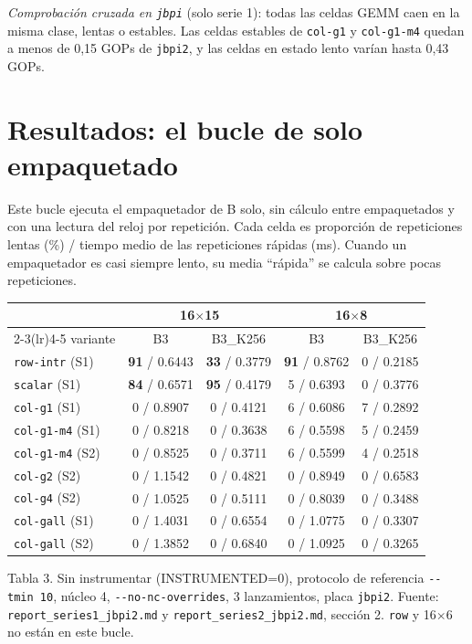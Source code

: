 \documentclass[10pt,a4paper]{article}
\newcommand{\bad}[1]{\textcolor{red!70!black}{\textbf{#1}}}
\begin{document}
\emph{Comprobación cruzada en \texttt{jbpi}} (solo serie 1): todas las celdas GEMM caen en la misma clase, lentas o estables. Las
celdas estables de \texttt{col-g1} y \texttt{col-g1-m4} quedan a menos de 0,15 GOPs de \texttt{jbpi2}, y las celdas en estado lento
varían hasta 0,43 GOPs.

\clearpage
\section{Resultados: el bucle de solo empaquetado}
\label{sec:packonly}
Este bucle ejecuta el empaquetador de B solo, sin cálculo entre empaquetados y con una lectura del reloj por repetición. Cada celda es
proporción de repeticiones lentas (\%) / tiempo medio de las repeticiones rápidas (ms). Cuando un empaquetador es casi siempre lento,
su media ``rápida'' se calcula sobre pocas repeticiones.

\begin{center}\footnotesize\setlength{\tabcolsep}{4pt}
\begin{tabular}{@{}lcccc@{}}
\toprule
 & \multicolumn{2}{c}{16$\times$15} & \multicolumn{2}{c}{16$\times$8} \\
\cmidrule(lr){2-3}\cmidrule(lr){4-5}
variante & B3 & B3\_K256 & B3 & B3\_K256 \\
\midrule
\texttt{row-intr} (S1) & \bad{91} / 0.6443 & \bad{33} / 0.3779 & \bad{91} / 0.8762 & 0 / 0.2185 \\
\texttt{scalar} (S1) & \bad{84} / 0.6571 & \bad{95} / 0.4179 & 5 / 0.6393 & 0 / 0.3776 \\
\texttt{col-g1} (S1) & 0 / 0.8907 & 0 / 0.4121 & 6 / 0.6086 & 7 / 0.2892 \\
\texttt{col-g1-m4} (S1) & 0 / 0.8218 & 0 / 0.3638 & 6 / 0.5598 & 5 / 0.2459 \\
\texttt{col-g1-m4} (S2) & 0 / 0.8525 & 0 / 0.3711 & 6 / 0.5599 & 4 / 0.2518 \\
\texttt{col-g2} (S2) & 0 / 1.1542 & 0 / 0.4821 & 0 / 0.8949 & 0 / 0.6583 \\
\texttt{col-g4} (S2) & 0 / 1.0525 & 0 / 0.5111 & 0 / 0.8039 & 0 / 0.3488 \\
\texttt{col-gall} (S1) & 0 / 1.4031 & 0 / 0.6554 & 0 / 1.0775 & 0 / 0.3307 \\
\texttt{col-gall} (S2) & 0 / 1.3852 & 0 / 0.6840 & 0 / 1.0925 & 0 / 0.3265 \\
\bottomrule
\end{tabular}
\end{center}
{\footnotesize Tabla 3. Sin instrumentar (INSTRUMENTED=0), protocolo de referencia \texttt{-{}-tmin 10}, núcleo 4,
\texttt{-{}-no-nc-overrides}, 3 lanzamientos, placa \texttt{jbpi2}. Fuente: \texttt{report\_series1\_jbpi2.md} y
\texttt{report\_series2\_jbpi2.md}, sección 2. \texttt{row} y 16$\times$6 no están en este bucle.}
\end{document}
